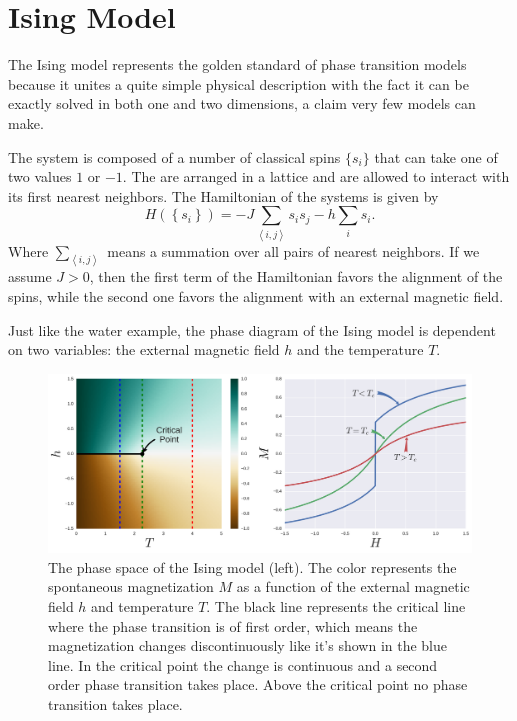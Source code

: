 \section{Ising Model}
\label{sec:ising}

The Ising model represents the golden standard of phase transition models
because it unites a quite simple physical description with the fact it can be
exactly solved in both one and two dimensions, a claim very few models can
make.

The system is composed of a number of classical spins $\{s_i\}$ that can take
one of two values $1$ or $-1$. The are arranged in a lattice and are allowed to
interact with its first nearest neighbors. The Hamiltonian of the systems is
given by
\begin{equation}
    \label{eq:ising}
    H\left(\left\{s_{i}\right\}\right) = 
        -J\sum_{\left\langle i,j\right\rangle}s_{i}s_{j}
        -h\sum_{i}s_{i}.
\end{equation}
Where $\sum_{\left\langle i,j\right\rangle}$ means a summation over all pairs
of nearest neighbors. If we assume $J>0$, then the first term of the
Hamiltonian favors the alignment of the spins, while the second one 
favors the alignment with an external magnetic field.

Just like the water example, the phase diagram of the Ising model is dependent
on two variables: the external magnetic field $h$ and the temperature $T$.

\begin{figure}
\begin{center}
    \includegraphics[scale=0.4]{chapters/ch2-crit/figs/ising_phase2}
\end{center}
\caption{The phase space of the Ising model (left). The color represents the
    spontaneous magnetization $M$ as a function of the external magnetic field
    $h$ and temperature $T$. The black line represents the critical line where
    the phase transition is of first order, which means the magnetization
    changes discontinuously like it's shown in the blue line. In the critical
    point the change is continuous and a second order phase transition takes
    place. Above the critical point no phase transition takes place.}
\label{fig:ising_phase2}
\end{figure}


